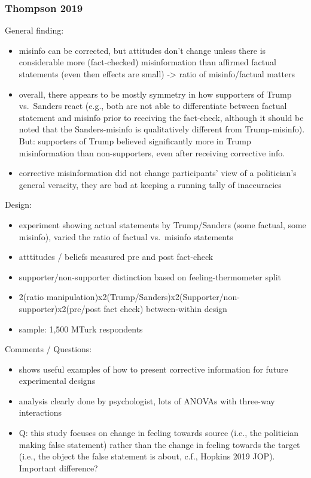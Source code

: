 \documentclass[11pt,article,oneside]{memoir}
\begin{document}
\hypertarget{thompson-2019}{%
\subsubsection{Thompson 2019}\label{thompson-2019}}

\textcite{thompson2019might}

General finding:

\begin{itemize}
\tightlist
\item
  misinfo can be corrected, but attitudes don't change unless there is
  considerable more (fact-checked) misinformation than affirmed factual
  statements (even then effects are small) -\textgreater{} ratio of
  misinfo/factual matters
\item
  overall, there appears to be mostly symmetry in how supporters of
  Trump vs.~Sanders react (e.g., both are not able to differentiate
  between factual statement and misinfo prior to receiving the
  fact-check, although it should be noted that the Sanders-misinfo is
  qualitatively different from Trump-misinfo). But: supporters of Trump
  believed significantly more in Trump misinformation than
  non-supporters, even after receiving corrective info.
\item
  corrective misinformation did not change participants' view of a
  politician's general veracity, they are bad at keeping a running tally
  of inaccuracies
\end{itemize}

Design:

\begin{itemize}
\tightlist
\item
  experiment showing actual statements by Trump/Sanders (some factual,
  some misinfo), varied the ratio of factual vs.~misinfo statements
\item
  atttitudes / beliefs measured pre and post fact-check
\item
  supporter/non-supporter distinction based on feeling-thermometer split
\item
  2(ratio
  manipulation)x2(Trump/Sanders)x2(Supporter/non-supporter)x2(pre/post
  fact check) between-within design
\item
  sample: 1,500 MTurk respondents
\end{itemize}

Comments / Questions:

\begin{itemize}
\tightlist
\item
  shows useful examples of how to present corrective information for
  future experimental designs
\item
  analysis clearly done by psychologist, lots of ANOVAs with three-way
  interactions
\item
  Q: this study focuses on change in feeling towards source (i.e., the
  politician making false statement) rather than the change in feeling
  towards the target (i.e., the object the false statement is about,
  c.f., Hopkins 2019 JOP). Important difference?
\end{itemize}
\end{document}
